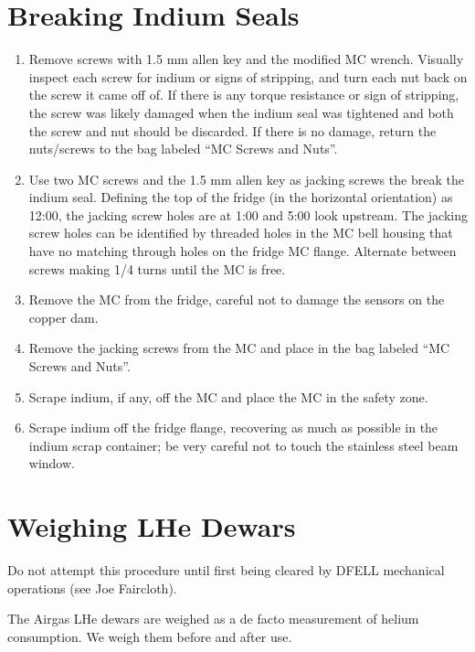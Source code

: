 \section{Breaking Indium Seals}
\begin{enumerate}
 \item Remove screws with 1.5 mm allen key and the modified MC wrench.  Visually inspect each screw for indium or signs of stripping, and turn each nut back on the screw it came off of.  If there is any torque resistance or sign of stripping, the screw was likely damaged when the indium seal was tightened and both the screw and nut should be discarded.  If there is no damage, return the nuts/screws to the bag labeled ``MC Screws and Nuts''.
\item Use two MC screws and the 1.5 mm allen key as jacking screws the break the indium seal.  Defining the top of the fridge (in the horizontal orientation) as 12:00, the jacking screw holes are at 1:00 and 5:00 look upstream.  The jacking screw holes can be identified by threaded holes in the MC bell housing that have no matching through holes on the fridge MC flange.  Alternate between screws making 1/4 turns until the MC is free.
\item Remove the MC from the fridge, careful not to damage the sensors on the copper dam.
\item Remove the jacking screws from the MC and place in the bag labeled ``MC Screws and Nuts''.
\item Scrape indium, if any, off the MC and place the MC in the safety zone.
\item Scrape indium off the fridge flange, recovering as much as possible in the indium scrap container; be very careful not to touch the stainless steel beam window.
\end{enumerate}

\section{Weighing LHe Dewars}
\label{weigh-250LD}

Do not attempt this procedure until first being cleared by DFELL mechanical operations (see Joe Faircloth).

The Airgas LHe dewars are weighed as a de facto measurement of helium consumption.  We weigh them before and after use.

